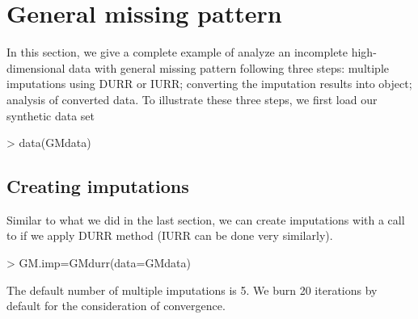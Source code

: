 \documentclass[a4paper]{article}
\begin{document}
\section{General missing pattern} \label{Gene}

In this section, we give a complete example of analyze an incomplete high-dimensional data with general missing pattern following three steps: multiple imputations using DURR or IURR; converting the imputation results into  object; analysis of converted data.
To illustrate these three steps, we first load our synthetic data set 
\begin{Schunk}
\begin{Sinput}
> data(GMdata)
\end{Sinput}
\end{Schunk}
\subsection{Creating imputations}
Similar to what we did in the last section, we can create imputations with a call to  if we apply DURR method (IURR can be done very similarly).
\begin{Schunk}
\begin{Sinput}
> GM.imp=GMdurr(data=GMdata)
\end{Sinput}
\end{Schunk}
The default number of multiple imputations is 5. We burn 20 iterations by default for the consideration of convergence.
\end{document}
